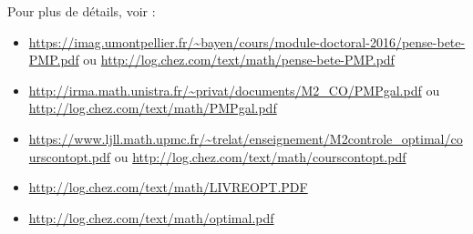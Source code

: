 \documentclass[10pt]{article}
\begin{document}
Pour plus de détails, voir :
\begin{itemize}
     \setlength{\itemsep}{1pt}
     \setlength{\parskip}{0pt}
     \setlength{\parsep}{0pt}
\item \url{https://imag.umontpellier.fr/~bayen/cours/module-doctoral-2016/pense-bete-PMP.pdf} ou \url{http://log.chez.com/text/math/pense-bete-PMP.pdf}
\item \url{http://irma.math.unistra.fr/~privat/documents/M2_CO/PMPgal.pdf} ou \url{http://log.chez.com/text/math/PMPgal.pdf}
\item \url{https://www.ljll.math.upmc.fr/~trelat/enseignement/M2controle_optimal/courscontopt.pdf} ou \url {http://log.chez.com/text/math/courscontopt.pdf}
\item \url{http://log.chez.com/text/math/LIVREOPT.PDF}
\item \url{http://log.chez.com/text/math/optimal.pdf}
\end{itemize}
\end{document}
